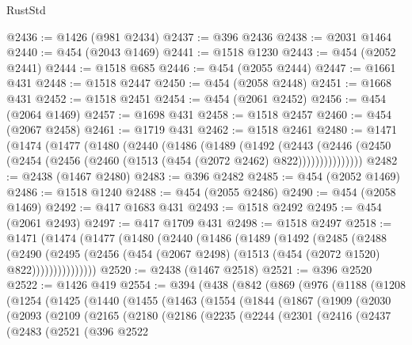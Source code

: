 \begin{lexlean}{RustStd}
\begin{coremodule}
@2436 := @1426 (@981 @2434)
@2437 := @396 @2436
@2438 := @2031 @1464
@2440 := @454 (@2043 @1469)
@2441 := @1518 @1230
@2443 := @454 (@2052 @2441)
@2444 := @1518 @685
@2446 := @454 (@2055 @2444)
@2447 := @1661 @431
@2448 := @1518 @2447
@2450 := @454 (@2058 @2448)
@2451 := @1668 @431
@2452 := @1518 @2451
@2454 := @454 (@2061 @2452)
@2456 := @454 (@2064 @1469)
@2457 := @1698 @431
@2458 := @1518 @2457
@2460 := @454 (@2067 @2458)
@2461 := @1719 @431
@2462 := @1518 @2461
@2480 := @1471
    (@1474
      (@1477
        (@1480
          (@2440
            (@1486
              (@1489
                (@1492
                  (@2443
                    (@2446
                      (@2450 (@2454 (@2456 (@2460 (@1513 (@454 (@2072 @2462) @822)))))))))))))))
@2482 := @2438 (@1467 @2480)
@2483 := @396 @2482
@2485 := @454 (@2052 @1469)
@2486 := @1518 @1240
@2488 := @454 (@2055 @2486)
@2490 := @454 (@2058 @1469)
@2492 := @417 @1683 @431
@2493 := @1518 @2492
@2495 := @454 (@2061 @2493)
@2497 := @417 @1709 @431
@2498 := @1518 @2497
@2518 := @1471
    (@1474
      (@1477
        (@1480
          (@2440
            (@1486
              (@1489
                (@1492
                  (@2485
                    (@2488
                      (@2490
                        (@2495
                          (@2456 (@454 (@2067 @2498) (@1513 (@454 (@2072 @1520) @822)))))))))))))))
@2520 := @2438 (@1467 @2518)
@2521 := @396 @2520
@2522 := @1426 @419
@2554 := @394
    (@438
      (@842
        (@869
          (@976
            (@1188
              (@1208
                (@1254
                  (@1425
                    (@1440
                      (@1455
                        (@1463
                          (@1554
                            (@1844
                              (@1867
                                (@1909
                                  (@2030
                                    (@2093
                                      (@2109
                                        (@2165
                                          (@2180
                                            (@2186
                                              (@2235
                                                (@2244
                                                  (@2301
                                                    (@2416
                                                      (@2437
                                                        (@2483
                                                          (@2521
                                                            (@396
                                                              @2522

\end{coremodule}
\end{lexlean}
